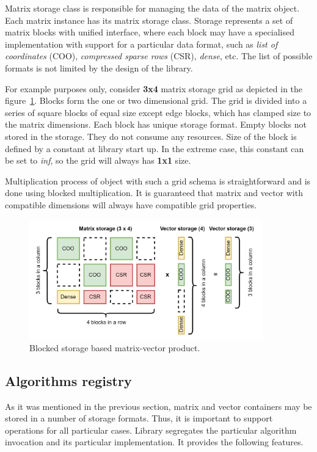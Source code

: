 Matrix storage class is responsible for managing the data of the matrix object. Each matrix instance has its matrix storage class. Storage represents a set of matrix blocks with unified interface, where each block may have a specialised implementation with support for a particular data format, such as \textit{list of coordinates} (COO), \textit{compressed sparse rows} (CSR), \textit{dense}, etc. The list of possible formats is not limited by the design of the library.

For example purposes only, consider \textbf{3x4} matrix storage grid as depicted in the figure~\ref{fig:blocked_mxv}. Blocks form the one or two dimensional grid. The grid is divided into a series of square blocks of equal size except edge blocks, which has clamped size to the matrix dimensions. Each block has unique storage format. Empty blocks not stored in the storage. They do not consume any resources. Size of the block is defined by a constant at library start up. In the extreme case, this constant can be set to \textit{inf}, so the grid will always has \textbf{1x1} size.

Multiplication process of object with such a grid schema is straightforward and is done using blocked multiplication. It is guaranteed that matrix and vector with compatible dimensions will always have compatible grid properties.

\begin{figure}
    \centering
    \includegraphics[width=0.9\textwidth]{images/blocked_storage_mxv.png}
    \caption{Blocked storage based matrix-vector product.}
    \label{fig:blocked_mxv}
\end{figure}

\subsection{Algorithms registry}

As it was mentioned in the previous section, matrix and vector containers may be stored in a number of storage formats. Thus, it is important to support operations for all particular cases. Library segregates the particular algorithm invocation and its particular implementation. It provides the following features.

